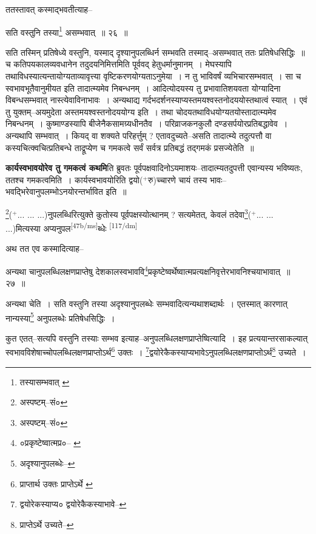 \documentclass[article,12pt,a4paper]{memoir}
\newcommand{\add}[1]{($^{+}$#1)}
\begin{document}
	ततस्तावत् कस्माद्भवतीत्याह-- 
	  
	सति वस्तुनि तस्या\footnote{तस्यासम्भवात् \cite{dp-msC}} असम्भवात् ॥ २६ ॥ 
	  
	सति तस्मिन् प्रतिषेध्ये वस्तुनि, यस्माद् दृश्यानुपलब्धिर्न सम्भवति तस्माद्--असम्भवात् ततः प्रतिषेधसिद्धिः ॥ च कतिपयकालव्यवधानेन तदुदयनिमित्तमिति पूर्ववद् हेतुधर्मानुमानम् । मेघस्यापि तथाविधस्यात्यन्तायोग्यताव्यावृत्त्या वृष्टिकरणयोग्यताऽनुमेया । न तु भाविवर्षं व्यभिचारसम्भवात् । सा च स्वभावभूतैवानुमीयत इति तादात्म्यमेव निबन्धनम् । आदित्योदयस्य तु प्रभावातिशयवता योग्यादिना विबन्धसम्भवात् नास्त्येवाविनाभावः । अन्यथाद्य गर्दभदर्शनस्याप्यस्तमयश्वस्तनोदययोस्तथात्वं स्यात् । एवं तु युक्तम्--अयमुदेता अस्तमयश्वस्तनोदययोग्य इति । तथा चोदयतथाविधयोग्यतयोस्तादात्म्यमेव निबन्धनम् । कुष्माण्डस्यापि बीजेनैकसामग्र्यधीनतैव । परिव्राजकनकुलौ दण्डसर्पयोरप्रतिबद्धावेव । अन्यथापि सम्भवात् । कियद् वा शक्यते परिहर्त्तुम् ? एतावदुच्यते--असति तादात्म्ये तदुत्पत्तौ वा कस्यचित्क्वचित्प्रतिबन्धे ताद्रूप्येण च गमकत्वे सर्वं सर्वत्र प्रतिबद्धं तद्गमकं प्रसज्येतेति ॥
	\pend
      

	  \pstart \textbf{कार्यस्वभावयोरेव तु गमकत्वं कथमि}ति ब्रुवतः पूर्वपक्षवादिनोऽयमाशयः--तादात्म्यतदुपत्ती एवान्यस्य भविष्यतः, ततश्च गमकत्वमिति । कार्यस्वभावयोरिति द्वयो\add{रु}च्चारणे चायं तस्य भावः--भवद्भिरेवानुपलम्भोऽनयोरन्तर्भावित इति ॥
	\pend
      

	  \pstart \footnote{अस्पष्टम्--सं०}\add{... ... ...}नुपलब्धिरित्युक्ते कुतोस्य पूर्वपक्षस्योत्थानम् ? सत्यमेतत्, केवलं तदेवा\footnote{अस्पष्टम्--सं०}\add{... ... ...}मित्यस्या अप्यनुपल\leavevmode\textsuperscript{\rmlatinfont\tiny [47b/ms]}ब्धेः  \leavevmode\textsuperscript{\rmlatinfont\tiny [117/dm]} 
	  
	अथ तत एव कस्मादित्याह-- 
	  
	अन्यथा चानुपलब्धिलक्षणप्राप्तेषु देशकालस्वभाववि\footnote{०प्रकृष्टेष्वात्मप्र०--\cite{dp-msB} \cite{dp-edP} \cite{dp-edH} \cite{dp-edE} \cite{dp-edN}}प्रकृष्टेष्वर्थेष्वात्मप्रत्यक्षनिवृत्तेरभावनिश्चयाभावात् ॥ २७ ॥ 
	  
	अन्यथा चेति । सति वस्तुनि तस्या अदृश्यानुपलब्धेः सम्भवादित्यन्यथाशब्दार्थः । एतस्मात् कारणात् नान्यस्या\footnote{अदृश्यानुपलब्धेः--\cite{dp-msD-n}} अनुपलब्धेः प्रतिषेधसिद्धिः । 
	  
	कुत एतत्--सत्यपि वस्तुनि तस्याः सम्भव इत्याह--अनुपलब्धिलक्षणप्राप्तेष्वित्यादि । इह प्रत्ययान्तरसाकल्यात् स्वभावविशेषाच्चोपलब्धिलक्षणप्राप्तोऽर्थ\footnote{प्राप्तार्थ उक्तः \cite{dp-msA} \cite{dp-msB} \cite{dp-edP} \cite{dp-edH} प्राप्तेऽर्थे \cite{dp-msC}} उक्तः । \footnote{द्वयोरेकस्याप्य० \cite{dp-msB} द्वयोरेकैकस्याभावे--\cite{dp-msC}}द्वयोरेकैकस्याप्यभावेऽनुपलब्धिलक्षणप्राप्तोऽर्थ\footnote{प्राप्तेऽर्थे उच्यते--\cite{dp-msC}} उच्यते । 
	  
\end{document}
